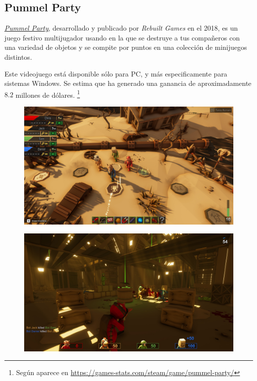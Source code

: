 \subsection{Pummel Party}

\href{http://www.rebuiltgames.com/}{\emph{Pummel Party}}, desarrollado y
publicado por \emph{Rebuilt Games} en el 2018, es un juego festivo multijugador
usando en la que se destruye a tus compañeros con una variedad de objetos y se
compite por puntos en una colección de minijuegos distintos.

Este videojuego está disponible sólo para PC, y más especificamente para
sistemas Windows. Se estima que ha generado una ganancia de aproximadamente
$8.2$ millones de dólares. \footnote{Según aparece en
\url{https://games-stats.com/steam/game/pummel-party/}}

\begin{figure}[H]
    \centering
    \begin{minipage}{0.40\textwidth}
        \centering
        \includegraphics[width=1.0\textwidth]{5-Cuerpo/Chapter3/PMP1.jpg} %
        \label{PMP-Tablero}
    \end{minipage}\hfill
    \begin{minipage}{0.40\textwidth}
        \centering
        \includegraphics[width=1.0\textwidth]{5-Cuerpo/Chapter3/PMP2.jpg} %
        \label{PMP-Shooter}
    \end{minipage}
\end{figure}
